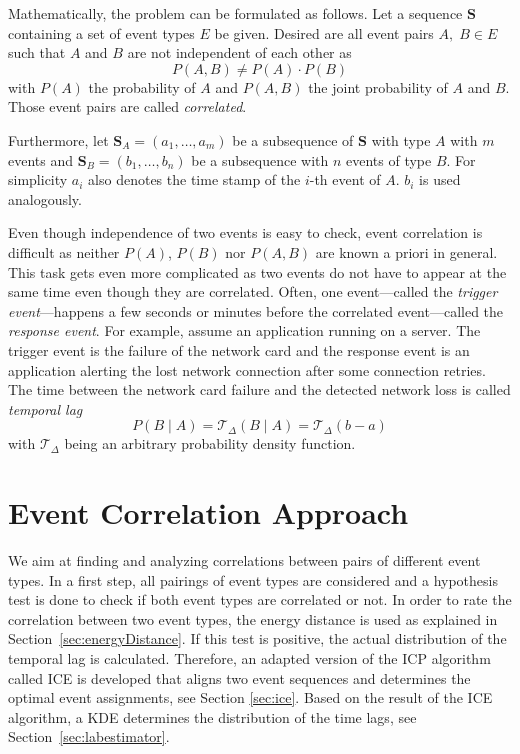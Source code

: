 \documentclass[conference]{IEEEtran}
\theoremstyle{examplestyle}
\begin{document}
Mathematically, the problem can be formulated as follows. Let a sequence \(\pmb{S}\) containing a set of event types \(E\) be given. Desired are all event pairs \(A, \; B \in E\) such that \(A\) and \(B\) are not independent of each other as
\begin{equation}
	P(A, B) \neq P(A) \cdot P(B)
\end{equation}
with \(P(A)\) the probability of \(A\) and \(P(A, B)\) the joint probability of \(A\) and \(B\). Those event pairs are called \textit{correlated}.

Furthermore, let \(\pmb{S}_A = (a_1,\ldots, a_m)\) be a subsequence of \(\pmb{S}\) with type \(A\) with \(m\) events and \(\pmb{S}_B=(b_1,\ldots, b_n)\) be a subsequence with \(n\) events of type \(B\). For simplicity \(a_i\) also denotes the time stamp of the \(i\)-th event of \(A\). \(b_i\) is used analogously.

Even though independence of two events is easy to check, event correlation is difficult as neither \(P(A)\), \(P(B)\) nor \(P(A, B)\) are known a priori in general. This task gets even more complicated as two events do not have to appear at the same time even though they are correlated. Often, one event---called the \textit{trigger event}---happens a few seconds or minutes before the correlated event---called the \textit{response event}. For example, assume an application running on a server. The trigger event is the failure of the network card and the response event is an application alerting the lost network connection after some connection retries. The time between the network card failure and the detected network loss is called \textit{temporal lag}
\begin{equation}
	P(B \; | \; A) = \mathcal{T}_\Delta (B \; | \; A) = \mathcal{T}_\Delta (b - a)
\end{equation}
with \(\mathcal{T}_\Delta\) being an arbitrary probability density function.




\section{Event Correlation Approach}
\label{sec:approach}
We aim at finding and analyzing correlations between pairs of different event types. In a first step, all pairings of event types are considered and a hypothesis test is done to check if both event types are correlated or not. In order to rate the correlation between two event types, the energy distance \cite{Rizzo2016} is used as explained in Section~\ref{sec:energyDistance}. 
If this test is positive, the actual distribution of the temporal lag is calculated. Therefore, an adapted version of the \ac{ICP} algorithm called \ac{ICE} is developed that aligns two event sequences and determines the optimal event assignments, see Section \ref{sec:ice}.
Based on the result of the \ac{ICE} algorithm, a \ac{KDE} determines the distribution of the time lags, see Section~\ref{sec:labestimator}.
\end{document}
